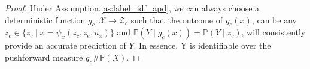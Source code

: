 


\begin{proof}
Under Assumption.\ref{as:label_idf_apd}, we can always choose a deterministic function $g_c: \mathcal{X}\rightarrow \mathcal{Z}_c$ such that the outcome of $g_c(x)$, can be any $z_c\in\{z_c\mid x= \psi_x(z_c, z_e, u_x)\}$ and $\mathbb{P}(Y\mid g_c(x))=\mathbb{P}(Y\mid z_c)$, will consistently provide an accurate prediction of $Y$. In essence, Y is identifiable over the pushforward measure $g_c\#\mathbb{P}(X)$.  







\end{proof}

